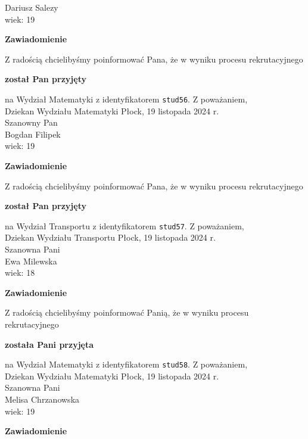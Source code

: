 \documentclass[12pt,a4paper]{article}
\begin{document}
Dariusz Salezy \\
wiek: 19
\bigskip
\begin{center}
    {\Large\textbf{Zawiadomienie}}
\end{center}
\bigskip 
Z radością chcielibyśmy poinformować Pana, że w wyniku procesu rekrutacyjnego
\begin{center}
\textsf{\textbf{został Pan przyjęty}}
\end{center}
na Wydział Matematyki z identyfikatorem \verb|stud56|. 
\vspace{2cm}
\noindent
Z poważaniem, \\
Dziekan
Wydziału Matematyki
\newpage
\hfill Płock, 19 listopada 2024 r. \\
\noindent
Szanowny Pan \\
Bogdan Filipek \\
wiek: 19
\bigskip
\begin{center}
    {\Large\textbf{Zawiadomienie}}
\end{center}
\bigskip 
Z radością chcielibyśmy poinformować Pana, że w wyniku procesu rekrutacyjnego
\begin{center}
\textsf{\textbf{został Pan przyjęty}}
\end{center}
na Wydział Transportu z identyfikatorem \verb|stud57|. 
\vspace{2cm}
\noindent
Z poważaniem, \\
Dziekan
Wydziału Transportu
\newpage
\hfill Płock, 19 listopada 2024 r. \\
\noindent
Szanowna Pani \\
Ewa Milewska \\
wiek: 18
\bigskip
\begin{center}
    {\Large\textbf{Zawiadomienie}}
\end{center}
\bigskip 
Z radością chcielibyśmy poinformować Panią, że w wyniku procesu rekrutacyjnego
\begin{center}
\textsf{\textbf{została Pani przyjęta}}
\end{center}
na Wydział Matematyki z identyfikatorem \verb|stud58|. 
\vspace{2cm}
\noindent
Z poważaniem, \\
Dziekan
Wydziału Matematyki
\newpage
\hfill Płock, 19 listopada 2024 r. \\
\noindent
Szanowna Pani \\
Melisa Chrzanowska \\
wiek: 19
\bigskip
\begin{center}
    {\Large\textbf{Zawiadomienie}}
\end{center}
\end{document}
